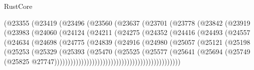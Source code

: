 \begin{lexlean}{RustCore}
\begin{coremodule}
                        (@23355
                          (@23419
                            (@23496
                              (@23560
                                (@23637
                                  (@23701
                                    (@23778
                                      (@23842
                                        (@23919
                                          (@23983
                                            (@24060
                                              (@24124
                                                (@24211
                                                  (@24275
                                                    (@24352
                                                      (@24416
                                                        (@24493
                                                          (@24557
                                                            (@24634
                                                              (@24698
                                                                (@24775
                                                                  (@24839
                                                                    (@24916
                                                                      (@24980
                                                                        (@25057
                                                                          (@25121
                                                                            (@25198
                                                                              (@25253
                                                                                (@25329
                                                                                  (@25393
                                                                                    (@25470
                                                                                      (@25525
                                                                                        (@25577
                                                                                          (@25641
                                                                                            (@25694
                                                                                              (@25749
                                                                                                (@25825
                                                                                                  @27747)))))))))))))))))))))))))))))))))))))))))))))))

\end{coremodule}
\end{lexlean}
